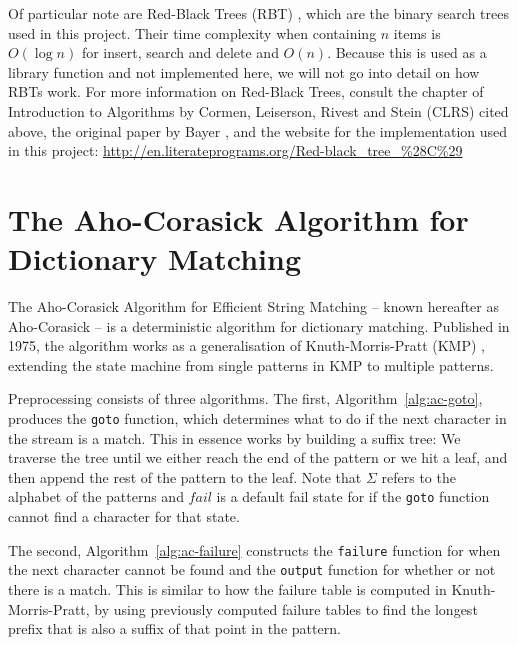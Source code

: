 \documentclass[ %
                    author={Dominic Joseph Moylett},
                    degree={MEng},
                     title={Dictionary Matching with Fingerprints},
                  subtitle={An Empirical Analysis},
                      type={research},
                      year={2015} ]{dissertation}
\begin{document}
Of particular note are Red-Black Trees (RBT) \cite{clrs:rbt}, which are the binary search trees used in this project. Their time complexity when containing $n$ items is $O(\log n)$ for insert, search and delete and $O(n)$. Because this is used as a library function and not implemented here, we will not go into detail on how RBTs work. For more information on Red-Black Trees, consult the chapter of Introduction to Algorithms by Cormen, Leiserson, Rivest and Stein (CLRS) cited above, the original paper by Bayer \cite{bayer:rbt}, and the website for the implementation used in this project: \url{http://en.literateprograms.org/Red-black_tree_%28C%29}

\section{The Aho-Corasick Algorithm for Dictionary Matching}
\label{sec:aho-corasick}

The Aho-Corasick Algorithm for Efficient String Matching \cite{Aho:1975:ESM:360825.360855}  --  known hereafter as Aho-Corasick  --  is a deterministic algorithm for dictionary matching. Published in 1975, the algorithm works as a generalisation of Knuth-Morris-Pratt (KMP) \cite{kmp}, extending the state machine from single patterns in KMP to multiple patterns.

Preprocessing consists of three algorithms. The first, Algorithm~\ref{alg:ac-goto}, produces the \texttt{goto} function, which determines what to do if the next character in the stream is a match. This in essence works by building a suffix tree: We traverse the tree until we either reach the end of the pattern or we hit a leaf, and then append the rest of the pattern to the leaf. Note that $\Sigma$ refers to the alphabet of the patterns and $fail$ is a default fail state for if the \texttt{goto} function cannot find a character for that state.

The second, Algorithm~\ref{alg:ac-failure} constructs the \texttt{failure} function for when the next character cannot be found and the \texttt{output} function for whether or not there is a match. This is similar to how the failure table is computed in Knuth-Morris-Pratt, by using previously computed failure tables to find the longest prefix that is also a suffix of that point in the pattern.
\end{document}
